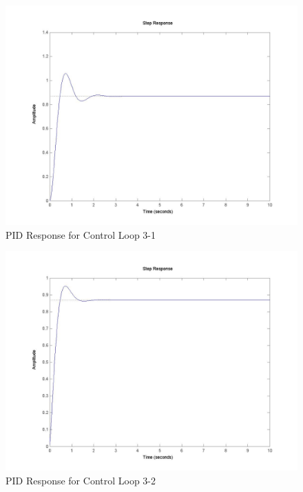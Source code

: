 	\begin{figure}[H]
		\includegraphics[width=\textwidth]{part3-1.jpg}
		\caption{PID Response for Control Loop 3-1}
	\end{figure}
	
	\begin{figure}[H]
		\includegraphics[width=\textwidth]{part3-2.jpg}
		\caption{PID Response for Control Loop 3-2}
	\end{figure}
	
